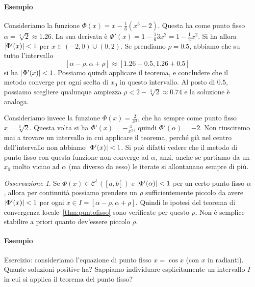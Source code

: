 \documentclass[a4paper]{report}
\DeclarePairedDelimiter{\abs}{\lvert}{\rvert}
\theoremstyle{definiton}
\theoremstyle{remark}
\newtheorem{remark}[theorem]{Osservazione}
\begin{document}
\paragraph{Esempio} Consideriamo la funzione $\Phi(x) = x - \frac16 (x^3-2)$. Questa ha come punto fisso $\alpha =\sqrt[3]{2} \approx 1.26$. La sua derivata è $\Phi'(x) = 1 - \frac{1}{6}3x^2 = 1 - \frac{1}{2}x^2$. Si ha allora $\abs{\Phi'(x)}<1$ per $x \in (-2,0) \cup (0,2)$. Se prendiamo $\rho = 0.5$, abbiamo che su tutto l'intervallo
\[
    [\alpha-\rho,\alpha+\rho] \approx [1.26-0.5,1.26+0.5]
\]
si ha $\abs{\Phi'(x)}<1$. Possiamo quindi applicare il teorema, e concludere che il metodo converge per ogni scelta di $x_0$ in questo intervallo. Al posto di $0.5$, possiamo scegliere qualunque ampiezza $\rho < 2 - \sqrt[3]{2} \approx 0.74$ e la soluzione è analoga.

Consideriamo invece la funzione $\Phi(x) = \frac{2}{x^2}$, che ha sempre come punto fisso $x=\sqrt[3]{2}$. Questa volta si ha $\Phi'(x) = -\frac{4}{x^3}$, quindi $\Phi'(\alpha) = -2$. Non riusciremo mai a trovare un intervallo in cui applicare il teorema, perché già nel centro dell'intervallo non abbiamo $\abs{\Phi'(x)}< 1$. Si può difatti vedere che il metodo di punto fisso con questa funzione non converge ad $\alpha$, anzi, anche se partiamo da un $x_0$ molto vicino ad $\alpha$ (ma diverso da esso) le iterate si allontanano sempre di più.

\begin{remark} \label{oss:corpuntofisso}
    Se $\Phi(x) \in \mathcal{C}^1([a,b])$ e $\abs{\Phi'(\alpha)} < 1$ per un certo punto fisso $\alpha$, allora per continuità possiamo prendere un $\rho$ sufficientemente piccolo da avere $\abs{\Phi'(x)} < 1$ per ogni $x \in I = [\alpha - \rho, \alpha + \rho]$. Quindi le ipotesi del teorema di convergenza locale~\ref{thm:puntofisso} sono verificate per questo $\rho$. Non è semplice stabilire a priori quanto dev'essere piccolo $\rho$.
\end{remark}
    
\paragraph{Esempio}

Esercizio: consideriamo l'equazione di punto fisso $x = \cos x$ (con $x$ in radianti). Quante soluzioni positive ha? Sappiamo individuare esplicitamente un intervallo $I$ in cui si applica il teorema del punto fisso?

\end{document}
